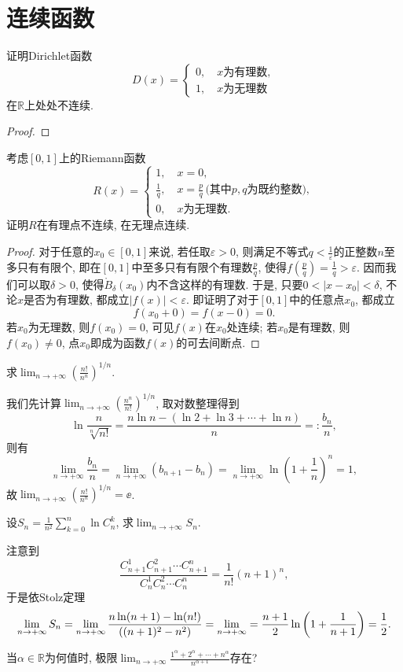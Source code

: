 \section{连续函数}
\begin{quiza}
\woe 证明Dirichlet函数\[D(x)=\begin{cases}
    0,\quad x\text{为有理数},\\
    1,\quad x\text{为无理数}
\end{cases}\]在\(\mathbb{R}\)上处处不连续.
\begin{proof}

\end{proof}
\woe 考虑\([0,1]\)上的Riemann函数\[R(x)=\begin{cases}
    1,\quad x=0,\\
    \frac{1}{q},\quad x=\frac{p}{q}\,\text{(其中\(p,q\)为既约整数)},\\
    0,\quad x\text{为无理数}.
\end{cases}\]证明\(R\)在有理点不连续, 在无理点连续.
\begin{proof}
对于任意的\(x_0\in[0,1]\)来说, 若任取\(\varepsilon>0\), 则满足不等式\(q<\frac{1}{\varepsilon}\)的正整数\(n\)至多只有有限个, 即在\([0,1]\)中至多只有有限个有理数\(\frac{p}{q}\), 使得\(f\left(\frac{p}{q}\right)=\frac{1}{q}>\varepsilon\). 因而我们可以取\(\delta>0\), 使得\(\mathring{B}_\delta(x_0)\)内不含这样的有理数. 于是, 只要\(0<|x-x_0|<\delta\), 不论\(x\)是否为有理数, 都成立\(|f(x)|<\varepsilon\). 即证明了对于\([0,1]\)中的任意点\(x_0\), 都成立\[f(x_0+0)=f(x-0)=0.\]
若\(x_0\)为无理数, 则\(f(x_0)=0\), 可见\(f(x)\)在\(x_0\)处连续; 若\(x_0\)是有理数, 则\(f(x_0)\ne 0\), 点\(x_0\)即成为函数\(f(x)\)的可去间断点.
\end{proof}
\woe 求\(\lim_{n\rightarrow+\infty}\left(\frac{n!}{n^n}\right)^{1/n}\).
\begin{solution}
我们先计算\(\lim_{n\rightarrow+\infty}\left(\frac{n^n}{n!}\right)^{1/n}\), 取对数整理得到\[\ln\frac{n}{\sqrt[n]{n!}}=\frac{n\ln n-\left(\ln 2+\ln 3+\cdots+\ln n\right)}{n}=:\frac{b_n}{n},\]则有\[\lim_{n\rightarrow+\infty}\frac{b_n}{n}=\lim_{n\rightarrow+\infty}\left(b_{n+1}-b_n\right)=\lim_{n\rightarrow+\infty}\ln\left(1+\frac{1}{n}\right)^n=1,\]故\(\lim_{n\rightarrow+\infty}\left(\frac{n!}{n^n}\right)^{1/n}=\ee\).
\end{solution}
\woe 设\(S_n=\frac{1}{n^2}\sum_{k=0}^{n}\ln C_n^k\), 求\(\lim_{n\rightarrow+\infty}S_n.\)
\begin{solution}
注意到\[\frac{C_{n+1}^1C_{n+1}^2\cdots C_{n+1}^n}{C_n^1C_n^2\cdots C_n^n}=\frac{1}{n!}(n+1)^n,\]于是依Stolz定理\[\lim_{n\rightarrow+\infty }S_n=\lim_{n\rightarrow+\infty}\frac{n\ln(n+1)-\ln(n!)}{\left((n+1)^2-n^2\right)}=\lim_{n\rightarrow+\infty}=\frac{n+1}{2}\ln\left(1+\frac{1}{n+1}\right)=\frac{1}{2}.\qedhere\]
\end{solution}
\woe 当\(\alpha\in\mathbb{R}\)为何值时, 极限\(\lim_{n\rightarrow+\infty}\frac{1^\alpha+2^\alpha+\cdots+n^\alpha}{n^{\alpha+1}}\)存在?
\begin{solution}


\end{solution}
\end{quiza}
